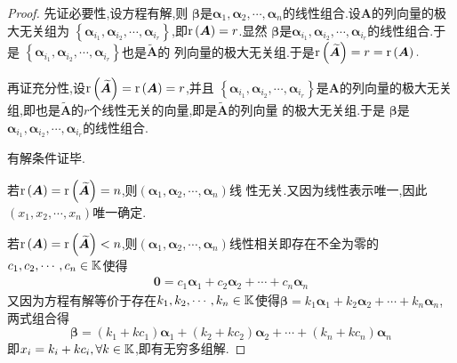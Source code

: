 {\begin{proof}
        先证必要性,设方程有解,则
        $\bm{\beta}$是$\bm{\alpha}_1,
            \bm{\alpha}_2,\cdots,\bm{\alpha}_n$的线性组合.设$\bm{A}$的列向量的极大无关组为
        $\left\{\bm{\alpha}_{i_1},\bm{\alpha}_{i_2}
            ,\cdots,\bm{\alpha}_{i_r}\right\}$,即$\mathrm{r} \left(\bm{A}\right)=r$.显然
        $\bm{\beta}$是$\bm{\alpha}_{i_1},
            \bm{\alpha}_{i_2},\cdots,\bm{\alpha}_{i_r}
        $的线性组合.于是
        $\left\{\bm{\alpha}_{i_1},
            \bm{\alpha}_{i_2},\cdots,\bm{\alpha}_{i_r}
            \right\}$也是$\widetilde{\bm{A}}$的
        列向量的极大无关组.于是$\mathrm{r} \left(\widetilde{\bm{A}}\right)=r=\mathrm{r} \left(\bm{A}\right).$

        再证充分性,设$\mathrm{r} \left(\widetilde{\bm{A}}\right)=
            \mathrm{r} \left(\bm{A}\right)=r$,并且
        $\left\{\bm{\alpha}_{i_1},\bm{\alpha}_{i_2},
            \cdots,\bm{\alpha}_{i_r}\right\}$是$\bm{A}$的列向量的极大无关组,即也是$\widetilde{\bm{A}}$的$
            r$个线性无关的向量,即是$\widetilde{\bm{A}}$的列向量
        的极大无关组.于是
        $\bm{\beta}$是$\bm{\alpha}_{i_1},
            \bm{\alpha}_{i_2},\cdots,\bm{\alpha}_{i_r}
        $的线性组合.

        有解条件证毕.

        若$\mathrm{r} \left(\bm{A}\right)=\mathrm{r} \left(
            \widetilde{\bm{A}}
            \right)=n$,则$\left(\bm{\alpha}_1,
            \bm{\alpha}_2,\cdots,\bm{\alpha}_n\right)$线
        性无关.又因为线性表示唯一,因此$\left(x_1,x_2,\cdots,x_n\right)$唯一确定.

        若$\mathrm{r} \left(\bm{A}\right)=\mathrm{r} \left(
            \widetilde{\bm{A}}
            \right)<n$,则$\left(\bm{\alpha}_1,
            \bm{\alpha}_2,\cdots,\bm{\alpha}_n\right)$线性相关即存在不全为零的$c_1,c_2,\cdots,c_n\in \mathbb{K} $使得
        \begin{align*}
            \bm{0}=c_1\bm{\alpha}_1
            +c_2\bm{\alpha}_2+\cdots+
            c_n\bm{\alpha}_n
        \end{align*}
        又因为方程有解等价于存在$k_1,k_2,\cdots,k_n\in \mathbb{K} $使得$
            \bm{\beta}=k_1\bm{\alpha}_1+k_2\bm{\alpha}_2+\cdots+k_n\bm{\alpha}_n
        $, 两式组合得
        \[
            \bm{\beta}=
            \left(k_1+kc_1\right)\bm{\alpha}_1+\left(
            k_2+kc_2
            \right)\bm{\alpha}_2+\cdots+\left(k_n+kc_n\right)
            \bm{\alpha}_n
        \]
        即$  x_i=k_i+kc_i,\forall k\in \mathbb{K} $,即有无穷多组解.
    \end{proof}
}
